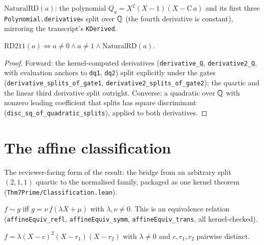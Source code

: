 \begin{definition}\label{def:naturalrd}\leanok
{}
$\mathrm{NaturalRD}(a)$: the polynomial $Q_a = X^{2}(X-1)(X-\mathrm{C}\,a)$ and
its first three \texttt{Polynomial.derivative}s split over $\mathbb{Q}$ (the fourth
derivative is constant), mirroring the transcript's \texttt{KDerived}.
\end{definition}

\begin{theorem}\label{thm:fidelity}\leanok
{}
$\mathrm{RD211}(a) \iff a\neq 0 \wedge a\neq 1 \wedge \mathrm{NaturalRD}(a)$.
\end{theorem}
\begin{proof}\leanok
Forward: the kernel-computed derivatives (\texttt{derivative\_Q},
\texttt{derivative2\_Q}, with evaluation anchors to \texttt{dq1},
\texttt{dq2}) split explicitly under the gates
(\texttt{derivative\_splits\_of\_gate1},
\texttt{derivative2\_splits\_of\_gate2}); the quartic and the linear third
derivative split outright.  Converse: a quadratic over $\mathbb{Q}$ with nonzero
leading coefficient that splits has square discriminant
(\texttt{disc\_sq\_of\_quadratic\_splits}), applied to both derivatives.
\end{proof}

\section{The affine classification}

The reviewer-facing form of the result: the bridge from an arbitrary split
$(2,1,1)$ quartic to the normalised family, packaged as one kernel theorem
(\texttt{Thm7Prime/Classification.lean}).

\begin{definition}\label{def:affequiv}\leanok
$f\sim g$ iff $g=\nu\,f(\lambda X+\mu)$ with $\lambda,\nu\neq 0$.  This is an
equivalence relation (\texttt{affineEquiv\_refl}, \texttt{affineEquiv\_symm},
\texttt{affineEquiv\_trans}, all kernel-checked).
\end{definition}

\begin{definition}\label{def:isp211}\leanok
$f=\lambda(X-c)^{2}(X-r_{1})(X-r_{2})$ with $\lambda\neq0$ and $c,r_{1},r_{2}$
pairwise distinct.
\end{definition}


